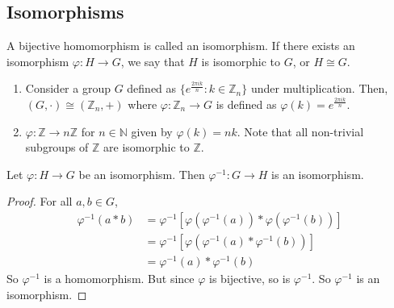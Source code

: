 \subsection{Isomorphisms}
A bijective homomorphism is called an isomorphism.
If there exists an isomorphism \(\varphi: H \to G\), we say that \(H\) is isomorphic to \(G\), or \(H \cong G\).
\begin{enumerate}
	\item Consider a group \(G\) defined as \(\{ e^{\frac{2 \pi i k}{n}} : k \in \mathbb Z_n \}\) under multiplication.
	      Then, \((G, \cdot) \cong (\mathbb Z_n, +)\) where \(\varphi: \mathbb Z_n \to G\) is defined as \(\varphi(k) = e^{\frac{2\pi i k}{n}}\).
	\item \(\varphi: \mathbb Z \to n\mathbb Z\) for \(n \in \mathbb N\) given by \(\varphi(k) = nk\).
	      Note that all non-trivial subgroups of \(\mathbb Z\) are isomorphic to \(\mathbb Z\).
\end{enumerate}

\begin{proposition}
	Let \(\varphi: H \to G\) be an isomorphism.
	Then \(\varphi^{-1}: G \to H\) is an isomorphism.
\end{proposition}
\begin{proof}
	For all \(a, b \in G\),
	\begin{align*}
		\varphi^{-1}(a \ast b) & = \varphi^{-1}\left[ \varphi(\varphi^{-1}(a)) \ast \varphi(\varphi^{-1}(b)) \right] \\
		                       & = \varphi^{-1}\left[ \varphi(\varphi^{-1}(a) \ast \varphi^{-1}(b)) \right]          \\
		                       & = \varphi^{-1}(a) \ast \varphi^{-1}(b)
	\end{align*}
	So \(\varphi^{-1}\) is a homomorphism.
	But since \(\varphi\) is bijective, so is \(\varphi^{-1}\).
	So \(\varphi^{-1}\) is an isomorphism.
\end{proof}
